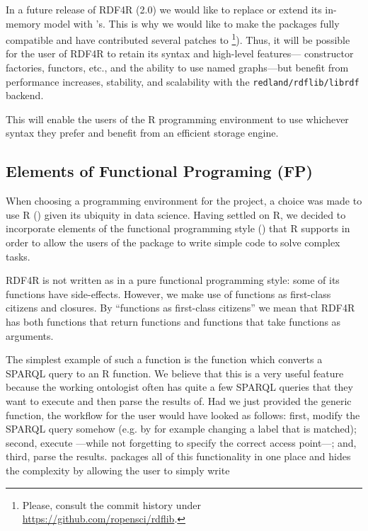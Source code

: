 In a future release of RDF4R (2.0) we would like to replace or extend its in-memory model with 's. This is why we would like to make the packages fully compatible and have contributed several patches to \footnote{Please, consult the commit history under \url{https://github.com/ropensci/rdflib}.}). Thus, it will be possible for the user of RDF4R to retain its syntax and high-level features--- constructor factories, functors, etc., and the ability to use named graphs---but benefit from performance increases, stability, and scalability with the {\tt redland/rdflib/librdf} backend.

This will enable the users of the R programming environment to use whichever syntax they prefer and benefit from an efficient storage engine.

\subsection{Elements of Functional Programing (FP)}

When choosing a programming environment for the project, a choice was made to use R (\cite{r_core_team_r:_2016}) given its ubiquity in data science. Having settled on R, we decided to incorporate elements of the functional programming style (\cite{wickham_advanced_2015}) that R supports in order to allow the users of the package to write simple code to solve complex tasks.

RDF4R is not written as in a pure functional programming style: some of its functions have side-effects. However, we make use of functions as first-class citizens and closures. By ``functions as first-class citizens'' we mean that RDF4R has both functions that return functions and functions that take functions as arguments.

The simplest example of such a function is the  function which converts a SPARQL query to an R function. We believe that this is a very useful feature because the working ontologist often has quite a few SPARQL queries that they want to execute and then parse the results of. Had we just provided the generic  function, the workflow for the user would have looked as follows: first, modify the SPARQL query somehow (e.g. by for example changing a label that is matched); second, execute ---while not forgetting to specify the correct access point---; and, third, parse the results.  packages all of this functionality in one place and hides the complexity by allowing the user to simply write


